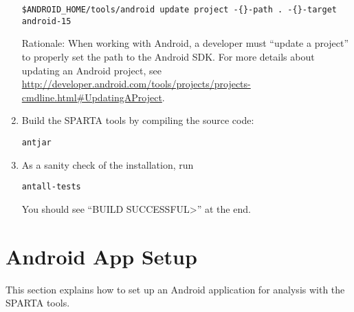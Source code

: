 \begin{enumerate}
\begin{Verbatim}
$ANDROID_HOME/tools/android update project -{}-path . -{}-target android-15
\end{Verbatim}


Rationale:  When working with Android, a developer must ``update a project'' to
properly set the path to the Android SDK\@.  For more details about
updating an Android project, see
\url{http://developer.android.com/tools/projects/projects-cmdline.html#UpdatingAProject}.


\item Build the SPARTA tools by compiling the source code:
\begin{alltt}
ant jar
\end{alltt}

\item
As a sanity check of the installation, run

\begin{alltt}
ant all-tests
\end{alltt}

You should see ``\<BUILD SUCCESSFUL>'' at the end.


%
%
%
%

\end{enumerate}


\section{Android App Setup\label{sec:antsetup}}

This section explains how to set up an Android application for analysis with the SPARTA tools.

